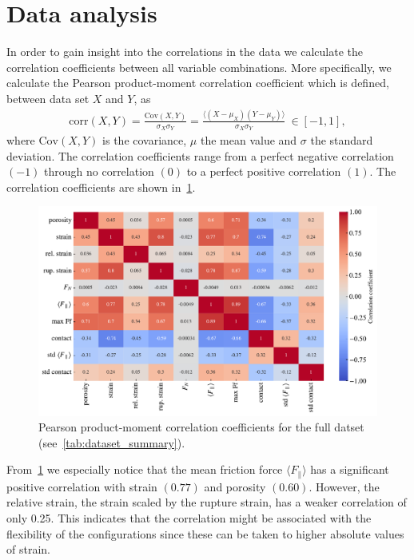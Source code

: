 \section{Data analysis}\label{sec:data_analysis}
In order to gain insight into the correlations in the data we calculate the correlation coefficients between all variable combinations. More specifically, we calculate the Pearson product-moment correlation coefficient which is defined, between data set $X$ and $Y$, as
\begin{align*}
  \mathrm{corr}(X,Y) = \frac{\mathrm{Cov}(X,Y)}{\sigma_X \sigma_Y} = \frac{\langle (X - \mu_X)(Y - \mu_Y)\rangle}{\sigma_X \sigma_Y} \ \in [-1, 1],
\end{align*}
where $\mathrm{Cov}(X,Y)$ is the covariance, $\mu$ the mean value and $\sigma$ the standard deviation. The correlation coefficients range from a perfect negative correlation $(-1)$ through no correlation $(0)$ to a perfect positive correlation $(1)$. The correlation coefficients are shown in~\cref{fig:corrcoef_matrix}.
\begin{figure}[H]
  \centering
  \includegraphics[width=\linewidth]{figures/ML/corrcoef_matrix.pdf}
  \caption{Pearson product-moment correlation coefficients for the full datset (see~\cref{tab:dataset_summary}).}
  \label{fig:corrcoef_matrix}
\end{figure}
From~\cref{fig:corrcoef_matrix} we especially notice that the mean friction
force $\langle F_{\parallel} \rangle$ has a significant positive correlation
with strain $(0.77)$ and porosity $(0.60)$. However, the relative strain, the
strain scaled by the rupture strain, has a weaker correlation of only 0.25.
This indicates that the correlation might be associated with the flexibility of
the configurations since these can be taken to higher absolute values of strain.
